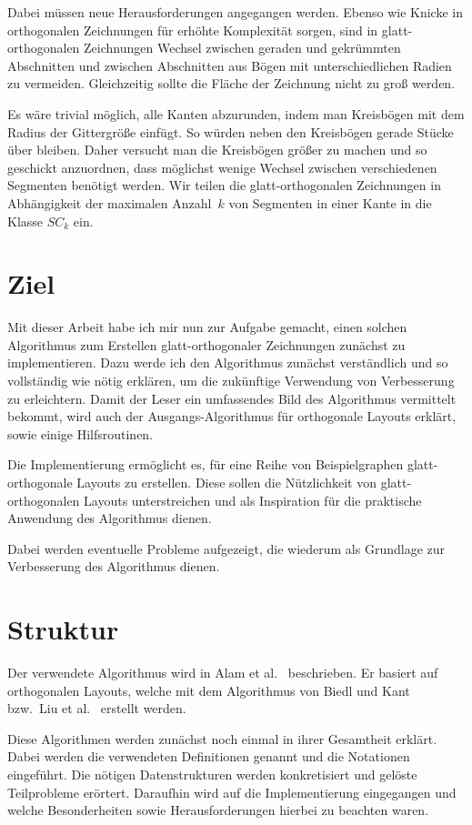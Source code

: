 \documentclass[a4paper]{scrreprt}
\theoremstyle{definition}
\newcommand{\go}{glatt-or\-tho\-go\-nal}
\begin{document}
Dabei müssen neue Herausforderungen angegangen werden. Ebenso wie Knicke in orthogonalen Zeichnungen für erhöhte Komplexität sorgen, sind in glatt-orthogonalen Zeichnungen Wechsel zwischen geraden und gekrümmten Abschnitten und zwischen Abschnitten aus Bögen mit unterschiedlichen Radien zu vermeiden. Gleichzeitig sollte die Fläche der Zeichnung nicht zu groß werden.

Es wäre trivial möglich, alle Kanten abzurunden, indem man Kreisbögen mit dem Radius der Gittergröße einfügt. So würden neben den Kreisbögen gerade Stücke über bleiben. Daher versucht man die Kreisbögen größer zu machen und so geschickt anzuordnen, dass möglichst wenige Wechsel zwischen verschiedenen Segmenten benötigt werden. Wir teilen die glatt-orthogonalen Zeichnungen in Abhängigkeit der maximalen Anzahl~$k$ von Segmenten in einer Kante in die Klasse $SC_k$ ein. 

\section{Ziel}

Mit dieser Arbeit habe ich mir nun zur Aufgabe gemacht, einen solchen Algorithmus zum Erstellen glatt-orthogonaler Zeichnungen zunächst zu implementieren. Dazu werde ich den Algorithmus zunächst verständlich und so vollständig wie nötig erklären, um die zukünftige Verwendung von Verbesserung zu erleichtern. Damit der Leser ein umfassendes Bild des Algorithmus vermittelt bekommt, wird auch der Ausgangs-Algorithmus für orthogonale Layouts erklärt, sowie einige Hilfsroutinen. 

Die Implementierung ermöglicht es, für eine Reihe von Beispielgraphen \go e Layouts zu erstellen. Diese sollen die Nützlichkeit von glatt-orthogonalen Layouts unterstreichen und als Inspiration für die praktische Anwendung des Algorithmus dienen.

Dabei werden eventuelle Probleme aufgezeigt, die wiederum als Grundlage zur Verbesserung des Algorithmus dienen. 

\section{Struktur}


Der verwendete Algorithmus wird in Alam et al.~\cite{smooth-13} beschrieben. Er basiert auf orthogonalen
Layouts, welche mit dem Algorithmus von Biedl und Kant~\cite{biedl+kant-98} bzw.\ Liu et al.~\cite{liu+etal-98} erstellt
werden.

Diese Algorithmen werden zunächst noch einmal in ihrer Gesamtheit erklärt. Dabei werden die
verwendeten Definitionen genannt und die Notationen eingeführt. Die nötigen Datenstrukturen
werden konkretisiert und gelöste Teilprobleme erörtert. Daraufhin wird auf die Implementierung eingegangen und welche Besonderheiten sowie Herausforderungen hierbei zu
beachten waren. 
\end{document}
